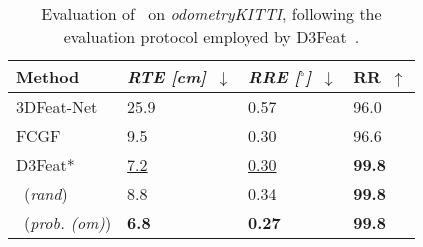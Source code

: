 
\begin{table}[t]
    \setlength{\tabcolsep}{6pt}
    \renewcommand{\arraystretch}{1.2}
	\centering
    \begin{tabularx}{\textwidth}{lYYY}
			\hline
			Method & \textit{RTE [cm]}~$\downarrow$ & \textit{RRE [$^\circ$]}~$\downarrow$ & RR~$\uparrow$  \\
			\hline
 			3DFeat-Net~\cite{yew20183dfeat} & 25.9 &  0.57 & 96.0  \\
 			FCGF~\cite{Choy2019FCGF} & 9.5  & 0.30  & 96.6\\
 			D3Feat*~\cite{bai2020d3feat} & \underline{7.2} %
 			& \underline{0.30} %
 			& \textbf{99.8} \\
 			\acro\ (\textit{rand}) & 8.8 & 0.34 & \textbf{99.8}  \\ 
 			\acro\ (\textit{prob. (om)}) &  \textbf{6.8} & \textbf{0.27} & \textbf{99.8} \\
			\hline
	\end{tabularx}
	\caption{Evaluation of \acro\ on \emph{odometryKITTI}, following the evaluation protocol employed by D3Feat~\cite{bai2020d3feat}.}
	\label{tab:kitti}
\end{table}